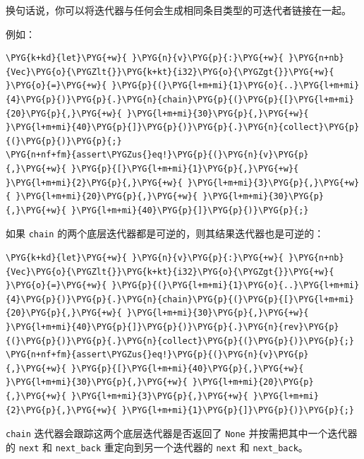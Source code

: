 换句话说，你可以将迭代器与任何会生成相同条目类型的可迭代者链接在一起。

例如：

\begin{Verbatim}[commandchars=\\\{\},breaklines=true,breakanywhere=true,fontsize=\codefont,xleftmargin=17bp]
\PYG{k+kd}{let}\PYG{+w}{ }\PYG{n}{v}\PYG{p}{:}\PYG{+w}{ }\PYG{n+nb}{Vec}\PYG{o}{\PYGZlt{}}\PYG{k+kt}{i32}\PYG{o}{\PYGZgt{}}\PYG{+w}{ }\PYG{o}{=}\PYG{+w}{ }\PYG{p}{(}\PYG{l+m+mi}{1}\PYG{o}{..}\PYG{l+m+mi}{4}\PYG{p}{)}\PYG{p}{.}\PYG{n}{chain}\PYG{p}{(}\PYG{p}{[}\PYG{l+m+mi}{20}\PYG{p}{,}\PYG{+w}{ }\PYG{l+m+mi}{30}\PYG{p}{,}\PYG{+w}{ }\PYG{l+m+mi}{40}\PYG{p}{]}\PYG{p}{)}\PYG{p}{.}\PYG{n}{collect}\PYG{p}{(}\PYG{p}{)}\PYG{p}{;}
\PYG{n+nf+fm}{assert\PYGZus{}eq!}\PYG{p}{(}\PYG{n}{v}\PYG{p}{,}\PYG{+w}{ }\PYG{p}{[}\PYG{l+m+mi}{1}\PYG{p}{,}\PYG{+w}{ }\PYG{l+m+mi}{2}\PYG{p}{,}\PYG{+w}{ }\PYG{l+m+mi}{3}\PYG{p}{,}\PYG{+w}{ }\PYG{l+m+mi}{20}\PYG{p}{,}\PYG{+w}{ }\PYG{l+m+mi}{30}\PYG{p}{,}\PYG{+w}{ }\PYG{l+m+mi}{40}\PYG{p}{]}\PYG{p}{)}\PYG{p}{;}
\end{Verbatim}

如果 \texttt{chain} 的两个底层迭代器都是可逆的，则其结果迭代器也是可逆的：

\begin{Verbatim}[commandchars=\\\{\},breaklines=true,breakanywhere=true,fontsize=\codefont,xleftmargin=17bp]
\PYG{k+kd}{let}\PYG{+w}{ }\PYG{n}{v}\PYG{p}{:}\PYG{+w}{ }\PYG{n+nb}{Vec}\PYG{o}{\PYGZlt{}}\PYG{k+kt}{i32}\PYG{o}{\PYGZgt{}}\PYG{+w}{ }\PYG{o}{=}\PYG{+w}{ }\PYG{p}{(}\PYG{l+m+mi}{1}\PYG{o}{..}\PYG{l+m+mi}{4}\PYG{p}{)}\PYG{p}{.}\PYG{n}{chain}\PYG{p}{(}\PYG{p}{[}\PYG{l+m+mi}{20}\PYG{p}{,}\PYG{+w}{ }\PYG{l+m+mi}{30}\PYG{p}{,}\PYG{+w}{ }\PYG{l+m+mi}{40}\PYG{p}{]}\PYG{p}{)}\PYG{p}{.}\PYG{n}{rev}\PYG{p}{(}\PYG{p}{)}\PYG{p}{.}\PYG{n}{collect}\PYG{p}{(}\PYG{p}{)}\PYG{p}{;}
\PYG{n+nf+fm}{assert\PYGZus{}eq!}\PYG{p}{(}\PYG{n}{v}\PYG{p}{,}\PYG{+w}{ }\PYG{p}{[}\PYG{l+m+mi}{40}\PYG{p}{,}\PYG{+w}{ }\PYG{l+m+mi}{30}\PYG{p}{,}\PYG{+w}{ }\PYG{l+m+mi}{20}\PYG{p}{,}\PYG{+w}{ }\PYG{l+m+mi}{3}\PYG{p}{,}\PYG{+w}{ }\PYG{l+m+mi}{2}\PYG{p}{,}\PYG{+w}{ }\PYG{l+m+mi}{1}\PYG{p}{]}\PYG{p}{)}\PYG{p}{;}
\end{Verbatim}

\texttt{chain} 迭代器会跟踪这两个底层迭代器是否返回了 \texttt{None} 并按需把其中一个迭代器的 \texttt{next} 和 \texttt{next\_back} 重定向到另一个迭代器的 \texttt{next} 和 \texttt{next\_back}。

